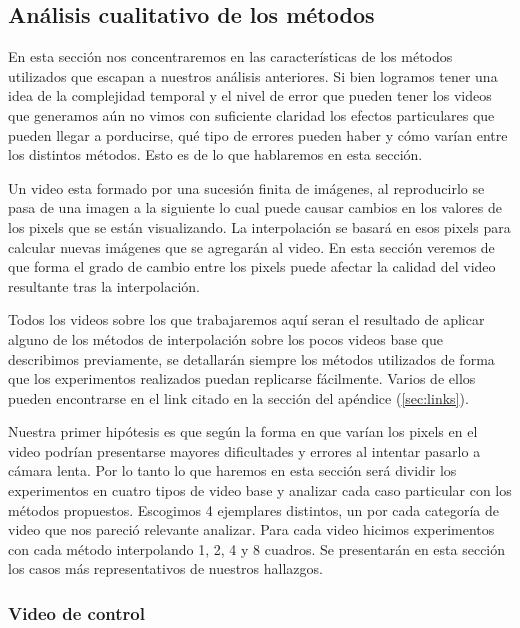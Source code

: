 \subsection{Análisis cualitativo de los métodos}
\label{subsec:cualitativo}

En esta sección nos concentraremos en las características de los métodos utilizados que escapan a nuestros análisis anteriores. Si bien logramos tener una idea de la complejidad temporal y el nivel de error que pueden tener los videos que generamos aún no vimos con suficiente claridad los efectos particulares que pueden llegar a porducirse, qué tipo de errores pueden haber y cómo varían entre los distintos métodos. Esto es de lo que hablaremos en esta sección.

Un video esta formado por una sucesión finita de imágenes, al reproducirlo se pasa de una imagen a la siguiente lo cual puede causar cambios en los valores de los pixels que se están visualizando. La interpolación se basará en esos pixels para calcular nuevas imágenes que se agregarán al video. En esta sección veremos de que forma el grado de cambio entre los pixels puede afectar la calidad del video resultante tras la interpolación.

Todos los videos sobre los que trabajaremos aquí seran el resultado de aplicar alguno de los métodos de interpolación sobre los pocos videos base que describimos previamente, se detallarán siempre los métodos utilizados de forma que los experimentos realizados puedan replicarse fácilmente. Varios de ellos pueden encontrarse en el link citado en la sección del apéndice (\ref{sec:links}).

Nuestra primer hipótesis es que según la forma en que varían los pixels en el video podrían presentarse mayores dificultades y errores al intentar pasarlo a cámara lenta. Por lo tanto lo que haremos en esta sección será dividir los experimentos en cuatro tipos de video base y analizar cada caso particular con los métodos propuestos. Escogimos 4 ejemplares distintos, un por cada categoría de video que nos pareció relevante analizar. Para cada video hicimos experimentos con cada método interpolando 1, 2, 4 y 8 cuadros. Se presentarán en esta sección los casos más representativos de nuestros hallazgos.

\subsubsection{Video de control}

